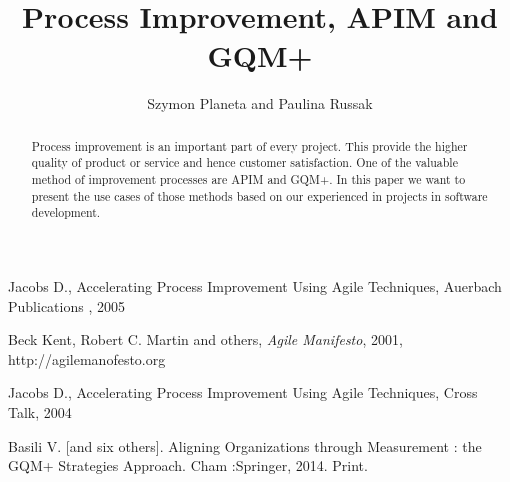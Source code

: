 \documentclass[letterpaper, 10 pt, conference]{ieeeconf}  %
\title{\LARGE \bf
Process Improvement, APIM and GQM+}
\author{Szymon Planeta and Paulina Russak%
}
\begin{document}
\maketitle
\thispagestyle{empty}
\pagestyle{empty}


\begin{abstract}

Process improvement is an important part of every project. This provide the higher quality of product or service and hence customer satisfaction. One of the valuable method of improvement processes are APIM and GQM+. In this paper we want to present the use cases of those methods based on our experienced in projects in software development.

\end{abstract}














\begin{thebibliography}{99}

 Jacobs D., Accelerating Process Improvement Using Agile Techniques,  Auerbach Publications , 2005

 Beck Kent, Robert C. Martin and others, \emph{Agile Manifesto}, 2001, http://agilemanofesto.org

 Jacobs D., Accelerating Process Improvement Using Agile Techniques,  Cross Talk, 2004

 Basili V. [and six others]. Aligning Organizations through Measurement : the GQM+ Strategies Approach. Cham :Springer, 2014. Print.




\end{thebibliography}
\end{document}
